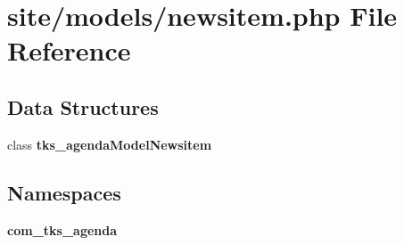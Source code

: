 \section{site/models/newsitem.php File Reference}
\label{site_2models_2newsitem_8php}
\subsection*{Data Structures}
\begin{DoxyCompactItemize}
\item 
class \textbf{ tks\+\_\+agenda\+Model\+Newsitem}
\end{DoxyCompactItemize}
\subsection*{Namespaces}
\begin{DoxyCompactItemize}
\item 
 \textbf{ com\+\_\+tks\+\_\+agenda}
\end{DoxyCompactItemize}
